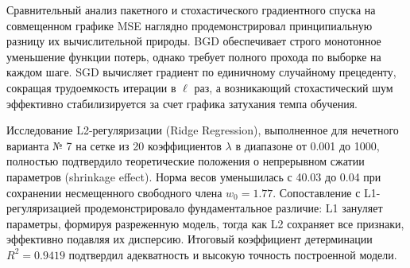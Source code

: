\documentclass[14pt,a4paper]{extarticle}
\begin{document}
Сравнительный анализ пакетного и стохастического градиентного спуска на совмещенном графике MSE наглядно продемонстрировал принципиальную разницу их вычислительной природы. BGD обеспечивает строго монотонное уменьшение функции потерь, однако требует полного прохода по выборке на каждом шаге. SGD вычисляет градиент по единичному случайному прецеденту, сокращая трудоемкость итерации в $\ell$ раз, а возникающий стохастический шум эффективно стабилизируется за счет графика затухания темпа обучения.

Исследование L2-регуляризации (Ridge Regression), выполненное для нечетного варианта № 7 на сетке из 20 коэффициентов $\lambda$ в диапазоне от 0.001 до 1000, полностью подтвердило теоретические положения о непрерывном сжатии параметров (shrinkage effect). Норма весов уменьшилась с 40.03 до 0.04 при сохранении несмещенного свободного члена $w_0 = 1.77$. Сопоставление с L1-регуляризацией продемонстрировало фундаментальное различие: L1 зануляет параметры, формируя разреженную модель, тогда как L2 сохраняет все признаки, эффективно подавляя их дисперсию. Итоговый коэффициент детерминации $R^2 = 0.9419$ подтвердил адекватность и высокую точность построенной модели.
\end{document}
